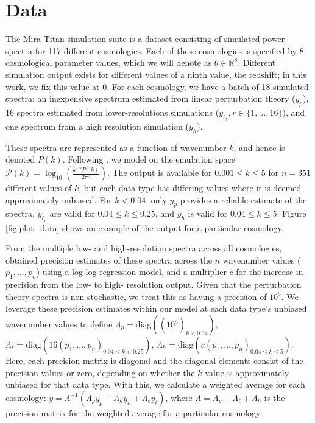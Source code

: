 \documentclass[11pt]{article}
\begin{document}
\section{Data}
\label{sec:data}

The Mira-Titan simulation suite is a dataset consisting of simulated power spectra for 117 different cosmologies. Each of these cosmologies is specified by 8 cosmological parameter values, which we will denote as $\theta \in \mathbb{R}^8$. Different simulation output exists for different values of a ninth value, the redshift; in this work, we fix this value at 0. For each cosmology, we have a batch of 18 simulated spectra: an inexpensive spectrum estimated from linear perturbation theory ($y_p$), 16 spectra estimated from lower-resolutions simulations ($y_{\ell_r}, r \in \{1,\dots,16\}$), and one spectrum from a high resolution simulation ($y_h$). 

These spectra are represented as a function of wavenumber $k$, and hence is denoted $P(k)$. Following \cite{moran2023mira}, we model on the emulation space $\mathcal{P}(k)=\log_{10}\left(\frac{k^{1.5}P(k)}{2\pi^2}\right)$. The output is available for $0.001 \leq k \leq 5$ for $n=351$ different values of $k$, but each data type has differing values where it is deemed approximately unbiased. For $k<0.04$, only $y_p$ provides a reliable estimate of the spectra. $y_{\ell_r}$ are valid for $0.04 \leq k \leq 0.25$, and $y_h$ is valid for $0.04 \leq k \leq 5$. Figure \ref{fig:plot_data} shows an example of the output for a particular cosmology.

From the multiple low- and high-resolution spectra across all cosmologies, \cite{moran2023mira} obtained precision estimates of these spectra across the $n$ wavenumber values ($p_1,\dots,p_n$) using a log-log regression model, and a multiplier $c$ for the increase in precision from the low- to high- resolution output. Given that the perturbation theory spectra is non-stochastic, we treat this as having a precision of $10^5$. We leverage these precision estimates within our model at each data type's unbiased wavenumber values to define $\Lambda_p = \text{diag}\left((10^5)_{k < 0.04}\right)$, $\Lambda_{\ell} = \text{diag}\left(16(p_1,\dots,p_n)_{0.04 \leq k < 0.25}\right)$, $\Lambda_h = \text{diag}\left(c(p_1,\dots,p_n)_{0.04 \leq k \leq 5}\right)$. Here, each precision matrix is diagonal and the diagonal elements consist of the precision values or zero, depending on whether the $k$ value is approximately unbiased for that data type. With this, we calculate a weighted average for each cosmology: $\bar y = \Lambda^{-1}(\Lambda_p y_p + \Lambda_h y_h + \Lambda_{\ell} \bar{y}_\ell)$, where $\Lambda = \Lambda_p + \Lambda_\ell + \Lambda_h$ is the precision matrix for the weighted average for a particular cosmology.
\end{document}
